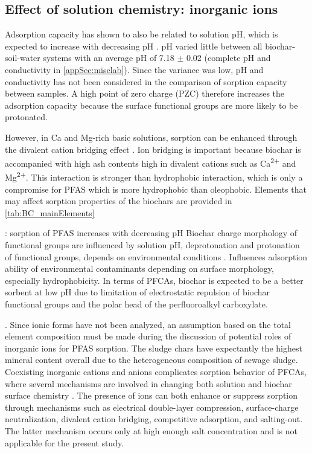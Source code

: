 \subsection{Effect of solution chemistry: inorganic ions}\label{sec:inorganic}
Adsorption capacity has shown to also be related to solution pH, which is expected to increase with decreasing pH \citep{du2014adsorption}. pH varied little between all biochar-soil-water systems with an average pH of 7.18 $\pm$ 0.02 (complete pH and conductivity in \cref{appSec:misclab}). Since the variance was low, pH and conductivity has not been considered in the comparison of sorption capacity between samples. A high point of zero charge (PZC) therefore increases the adsorption capacity because the surface functional groups are more likely to be protonated.

However, in Ca and Mg-rich basic solutions, sorption can be enhanced through the divalent cation bridging effect \citep{sigmund2022sorption}.  Ion bridging is important because biochar is accompanied with high ash contents high in divalent cations such as Ca\textsuperscript{2+} and Mg\textsuperscript{2+}. This interaction is stronger than hydrophobic interaction, which is only a compromise for PFAS which is more hydrophobic than oleophobic. Elements that may affect sorption properties of the biochars are provided in \cref{tab:BC_mainElements}
 
\citep{zhang2013sorption}: sorption of PFAS increases with decreasing pH
Biochar charge morphology of functional groups are influenced by solution pH, deprotonation and protonation of functional groups, depends on environmental conditions \citep{Li2019}. Influences adsorption ability of environmental contaminants depending on surface morphology, especially hydrophobicity. In terms of PFCAs, biochar is expected to be a better sorbent at low pH due to limitation of electrostatic repulsion of biochar functional groups and the polar head of the perfluoroalkyl carboxylate. 

. Since ionic forms have not been analyzed, an assumption based on the total element composition must be made during the discussion of potential roles of inorganic ions for PFAS sorption. The sludge chars have expectantly the highest mineral content overall due to the heterogeneous composition of sewage sludge. 
Coexisting inorganic cations and anions complicates sorption behavior of PFCAs, where several mechanisms are involved in changing both solution and biochar surface chemistry \citep{du2014adsorption}. The presence of ions can both enhance or suppress sorption through mechanisms such as electrical double-layer compression, surface-charge neutralization, divalent cation bridging, competitive adsorption, and salting-out. The latter mechanism occurs only at high enough salt concentration and is not applicable for the present study. 

